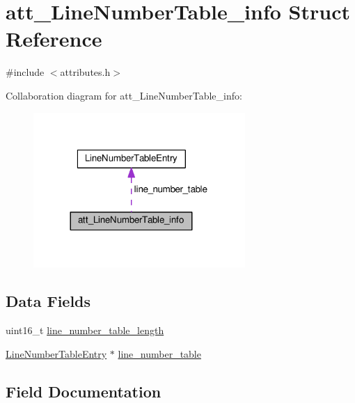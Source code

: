 \hypertarget{structatt__LineNumberTable__info}{}\section{att\+\_\+\+Line\+Number\+Table\+\_\+info Struct Reference}
\label{structatt__LineNumberTable__info}


{\ttfamily \#include $<$attributes.\+h$>$}



Collaboration diagram for att\+\_\+\+Line\+Number\+Table\+\_\+info\+:\nopagebreak
\begin{figure}[H]
\begin{center}
\leavevmode
\includegraphics[width=228pt]{structatt__LineNumberTable__info__coll__graph}
\end{center}
\end{figure}
\subsection*{Data Fields}
\begin{DoxyCompactItemize}
\item 
uint16\+\_\+t \hyperlink{structatt__LineNumberTable__info_a6c335e2b6b14577d9a0e063cd5a361e0}{line\+\_\+number\+\_\+table\+\_\+length}
\item 
\hyperlink{structLineNumberTableEntry}{Line\+Number\+Table\+Entry} $\ast$ \hyperlink{structatt__LineNumberTable__info_ac9c52cc4b931ea8cfc746ea0a1d573ac}{line\+\_\+number\+\_\+table}
\end{DoxyCompactItemize}


\subsection{Field Documentation}
